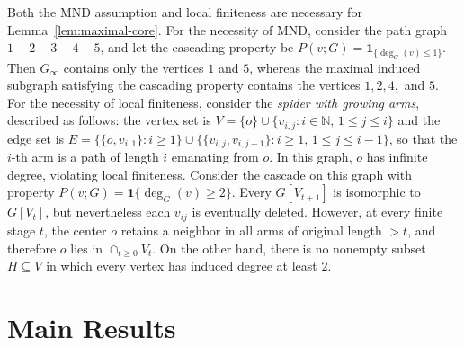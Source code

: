 \documentclass[11pt]{article}
\theoremstyle{plain}
\begin{document}
\begin{remark}
Both the MND assumption and local finiteness are necessary for Lemma~\ref{lem:maximal-core}. For the necessity of MND, consider the path graph $1-2-3-4-5$, 
and let the cascading property be $P(v;G)=\mathbf{1}_{\{\deg_G(v)\le 1\}}$.
Then \(G_\infty\) contains only the vertices \(1\) and \(5\), whereas the maximal induced subgraph satisfying the cascading property contains the vertices \(1,2,4,\) and \(5\). 
For the necessity of local finiteness, consider the \emph{spider with growing arms}, 
described as follows: the vertex set is $V = \{o\} \cup \{v_{i,j} : i \in \mathbb{N},\, 
1 \leq j \leq i\}$ and the edge set is $E = \{\{o, v_{i,1}\} : i \geq 1\} \cup 
\{\{v_{i,j}, v_{i,j+1}\} : i \geq 1,\, 1 \leq j \leq i-1\}$, so that the $i$-th 
arm is a path of length $i$ emanating from $o$. In this graph, $o$ has infinite degree, 
violating local finiteness. Consider the cascade on this graph with property $P(v; G) = 
\mathbf{1}\{\deg_G(v) \geq 2\}$. 
Every $G[V_{t+1}]$ is isomorphic to $G[V_t]$, but nevertheless each $v_{ij}$ is eventually deleted. 
However, at every finite stage $t$, the center $o$ retains a neighbor in all arms of original length $> t$, and therefore $o$ lies in $\cap_{t\geq 0} V_t$.
On the other hand, there is no nonempty subset $H \subseteq V$ in which every vertex has induced degree at least $2$.

\end{remark}




\section{Main Results}
\end{document}
